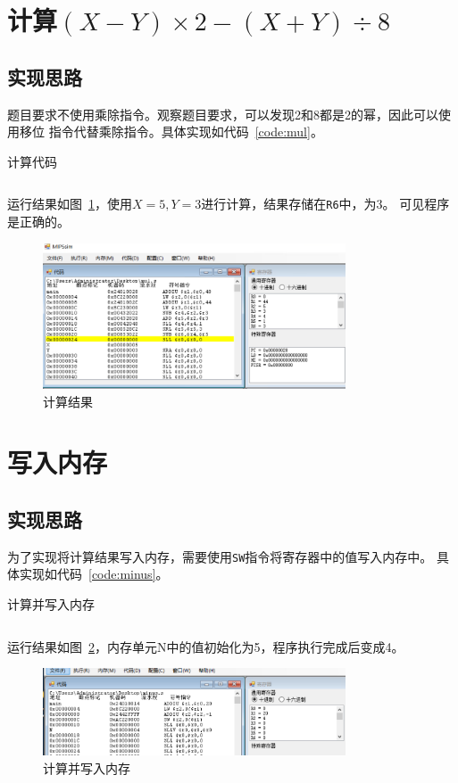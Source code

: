 \documentclass[a4paper,twoside]{article}
\begin{document}
\begin{spacing}{1.2}
\section{计算$(X-Y) \times 2 - (X+Y)\div 8$}

\subsection{实现思路}

题目要求不使用乘除指令。观察题目要求，可以发现2和8都是2的幂，因此可以使用移位
指令代替乘除指令。具体实现如代码~\ref{code:mul}。
\begin{listing}[htb]
	\caption{计算代码}
	\label{code:mul}
	\inputminted{nasm}{code/mul.txt}
\end{listing}

运行结果如图~\ref{fig:mul}，使用$X=5,Y=3$进行计算，结果存储在\texttt{R6}中，为$3$。
可见程序是正确的。
\begin{figure}[ht]
	\centering
	\includegraphics[width=0.8\textwidth]{images/mul.png}
	\caption{计算结果}
	\label{fig:mul}
\end{figure}


\section{写入内存}

\subsection{实现思路}

为了实现将计算结果写入内存，需要使用\texttt{SW}指令将寄存器中的值写入内存中。
具体实现如代码~\ref{code:minus}。
\begin{listing}[htb]
	\caption{计算并写入内存}
	\label{code:minus}
	\inputminted{nasm}{code/minus.txt}
\end{listing}

运行结果如图~\ref{fig:minus}，内存单元N中的值初始化为5，程序执行完成后变成4。
\begin{figure}[ht]
	\centering
	\includegraphics[width=0.8\textwidth]{images/minus.png}
	\caption{计算并写入内存}
	\label{fig:minus}
\end{figure}


\end{spacing}
\end{document}
